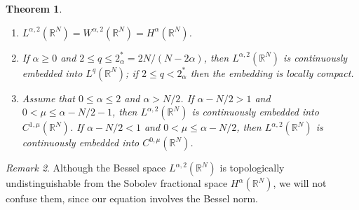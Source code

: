 \documentclass[11pt]{amsart}
\numberwithin{equation}{section}
\newtheorem{theorem}{Theorem}[section]
\newtheorem{lemma}[theorem]{Lemma}
\theoremstyle{remark}
\newtheorem{remark}[theorem]{Remark}
\theoremstyle{definition}
\begin{document}
\begin{theorem} 
	\label{th:1}
	\begin{enumerate}
		\item $L^{\alpha,2}(\mathbb{R}^N) = W^{\alpha,2}(\mathbb{R}^N) =
		H^\alpha (\mathbb{R}^N)$.
		\item If $\alpha \geq 0$ and $2 \leq q \leq 2_\alpha^*=2N/(N-2\alpha)$, then
		$L^{\alpha,2}(\mathbb{R}^N)$ is continuously embedded into $L^q(\mathbb{R}^N)$; if $2 \leq q < 2_\alpha^*$ then the embedding is locally compact.
		\item Assume that $0 \leq \alpha \leq 2$ and $\alpha > N/2$. If
		$\alpha -N/2 >1$ and $0< \mu \leq \alpha - N/2-1$, then
		$L^{\alpha,2}(\mathbb{R}^N)$ is continuously embedded into
		$C^{1,\mu}(\mathbb{R}^N)$. If $\alpha -N/2 <1$ and $0 < \mu \leq
		\alpha -N/2$, then $L^{\alpha,2}(\mathbb{R}^N)$ is continuously
		embedded into $C^{0,\mu}(\mathbb{R}^N)$.
	\end{enumerate}
\end{theorem}
\begin{remark}
	Although the Bessel space $L^{\alpha,2}(\mathbb{R}^N)$ is topologically undistinguishable from the Sobolev fractional space $H^\alpha(\mathbb{R}^N)$, we will not confuse them, since our equation involves the Bessel norm.
\end{remark}
%
%
%
\end{document}
